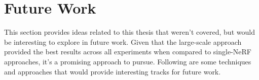 \begin{comment}
Following the successful implementation of a dataparser for real-world data, we applied our pipeline to data captured from an actual vehicle. Despite operational functionality, the results from the real-world data proved less than optimal. The limitations identified during these experiments are considered crucial factors in explaining these outcomes. Consequently, future work will address these constraints to further refine the performance of the NeRF-based pipeline for real-world applications.

- Pipeline from CARLA to Nerfstudio
    - Enables experimenting with data capture techniques that can later be applied to real world scenarios.
    - Enables running multiple experiments with different experiment settings, e.g. camera setup, vehicle speed, route, image resolution, etc., in a streamlined way.
    - The data output from the experiment-pipeline in CARLA is in a format supported by most NeRFs. Enables training NeRFs on the synthetic data captured in CARLA, and, based on the evaluation of the NeRF, tweak settings to improve the resulting image synthesis.
- A baseline for NeRFs trained on synthetic data captured in CARLA. 
    - Can be used to further improve both the data capture and the NeRF-models on synthetic data.
    - Can be used to experiment with data capture- and NeRF-settings.
    - The metrics used to evaluate the baseline (PSNR, SSIM and LPIPS) are widely used throughout NeRF-research and makes comparable.
- Block NeRF in Nerfstudio API
    - Creates a naive Block NeRF implementation in the Nerfstudio API, demonstrating how such an approach can substantially increase the quality of large scene NeRFs.
    - The PoC allows testing which parameters are important when capturing large scale data for NeRFs. E.g. the segment size, overlap between the blocks, image merging techniques.
- Side-by-side view
    - Leverage FFMPEG to create a script for generating side-by-side views of the rendered NeRF and the ground truth.
    - Makes qualitative assessment of the resulting NeRF easier.
\end{comment}

















\section{Future Work}
This section provides ideas related to this thesis that weren't covered, but would be interesting to explore in future work. Given that the large-scale approach provided the best results across all experiments when compared to single-NeRF approaches, it's a promising approach to pursue. Following are some techniques and approaches that would provide interesting tracks for future work.

